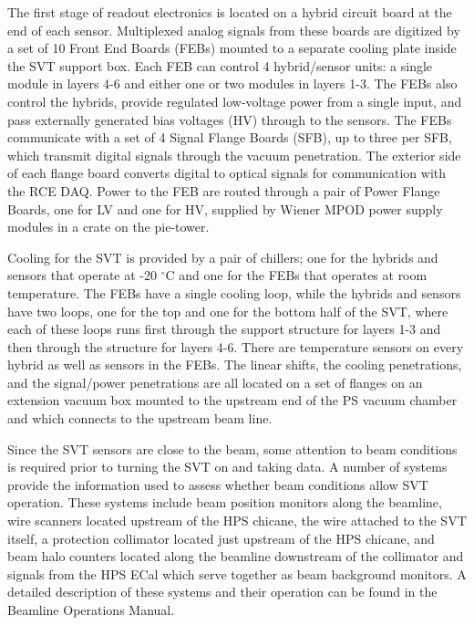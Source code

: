 \documentclass[12pt]{report}
\begin{document}
The first stage of readout electronics is located on a hybrid circuit board at the end of each sensor.  Multiplexed analog signals from these boards are digitized by a set of 10 Front End Boards (FEBs) mounted to a separate cooling plate inside the SVT support box. Each FEB can control 4 hybrid/sensor units: a single module in layers 4-6 and either one or two modules in layers 1-3. The FEBs also control the hybrids, provide regulated low-voltage power from a single input, and pass externally generated bias voltages (HV) through to the sensors.   The FEBs communicate with a set of 4 Signal Flange Boards (SFB), up to three per SFB, which transmit digital signals through the vacuum penetration.  The exterior side of each flange board converts digital to optical signals for communication with the RCE DAQ.  Power to the FEB are routed through a pair of Power Flange Boards, one for LV and one for HV, supplied by Wiener MPOD power supply modules in a crate on the pie-tower.

Cooling for the SVT is provided by a pair of chillers; one for the hybrids and sensors that operate at -20 $^\circ$C and one for the FEBs that operates at room temperature.  The FEBs have a single cooling loop, while the hybrids and sensors have two loops, one for the top and one for the bottom half of the SVT, where each of these loops runs first through the support structure for layers 1-3 and then through the structure for layers 4-6.  There are temperature sensors on every hybrid as well as sensors in the FEBs. The linear shifts, the cooling penetrations, and the signal/power penetrations are all located on a set of flanges on an extension vacuum box mounted to the upstream end of the PS vacuum chamber and which connects to the upstream beam line.

Since the SVT sensors are close to the beam, some attention to beam conditions is required prior to turning the SVT on and taking data. A number of systems provide the information used to assess whether beam conditions allow SVT operation. These systems include beam position monitors along the beamline, wire scanners located upstream of the HPS chicane, the wire attached to the SVT itself, a protection collimator located just upstream of the HPS chicane, and beam halo counters located along the beamline downstream of the collimator and signals from the HPS ECal which serve together as beam background monitors.  A detailed description of these systems and their operation can be found in the Beamline Operations Manual.
\end{document}
